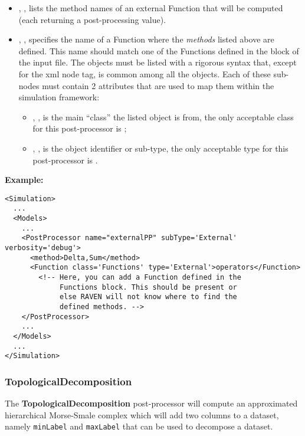 \begin{itemize}
  \item {}, ,
  lists the method names of an external Function that will be computed (each
  returning a post-processing value).
  \item {}, , specifies
  the name of a Function where the \textit{methods} listed above are defined.
  \nb This name should match one of the Functions defined in the
   block of the input file.
  The objects must be listed with a rigorous syntax that, except for the xml
  node tag, is common among all the objects.
  Each of these sub-nodes must contain 2 attributes that are used to map them
  within the simulation framework:

   \begin{itemize}
     \item {}, , is the main
     ``class'' the listed object is from, the only acceptable class for
     this post-processor is ;
     \item {}, , is the object
     identifier or sub-type, the only acceptable type for this post-processor is
     .
  \end{itemize}
\end{itemize}
\textbf{Example:}
\begin{lstlisting}[style=XML,morekeywords={subType,debug,name,class,type}]
<Simulation>
  ...
  <Models>
    ...
    <PostProcessor name="externalPP" subType='External' verbosity='debug'>
      <method>Delta,Sum</method>
      <Function class='Functions' type='External'>operators</Function>
        <!-- Here, you can add a Function defined in the
             Functions block. This should be present or
             else RAVEN will not know where to find the
             defined methods. -->
    </PostProcessor>
    ...
  </Models>
  ...
</Simulation>
\end{lstlisting}

\subsubsection{TopologicalDecomposition}
\label{TopologicalDecomposition}
The \textbf{TopologicalDecomposition} post-processor will compute an
approximated hierarchical Morse-Smale complex which will add two columns to a
dataset, namely \texttt{minLabel} and \texttt{maxLabel} that can be used to
decompose a dataset.
%

